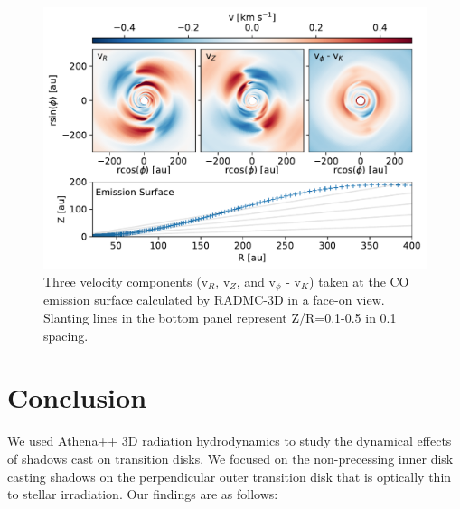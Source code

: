 \documentclass[twocolumn,tighten]{aastex631}
\begin{document}
\begin{figure}
\includegraphics[width=\linewidth]{Figure5.pdf}
    \caption{Three velocity components (v$_R$, v$_Z$, and v$_\phi$ - v$_K$) taken at the CO emission surface calculated by RADMC-3D in a face-on view. Slanting lines in the bottom panel represent Z/R=0.1-0.5 in 0.1 spacing.}
    \label{fig:5}
\end{figure}

\section{Conclusion} \label{sec:conclusion}
We used Athena++ 3D radiation hydrodynamics to study the dynamical effects of shadows cast on transition disks. We focused on the non-precessing inner disk casting shadows on the perpendicular outer transition disk that is optically thin to stellar irradiation. Our findings are as follows:
\end{document}
